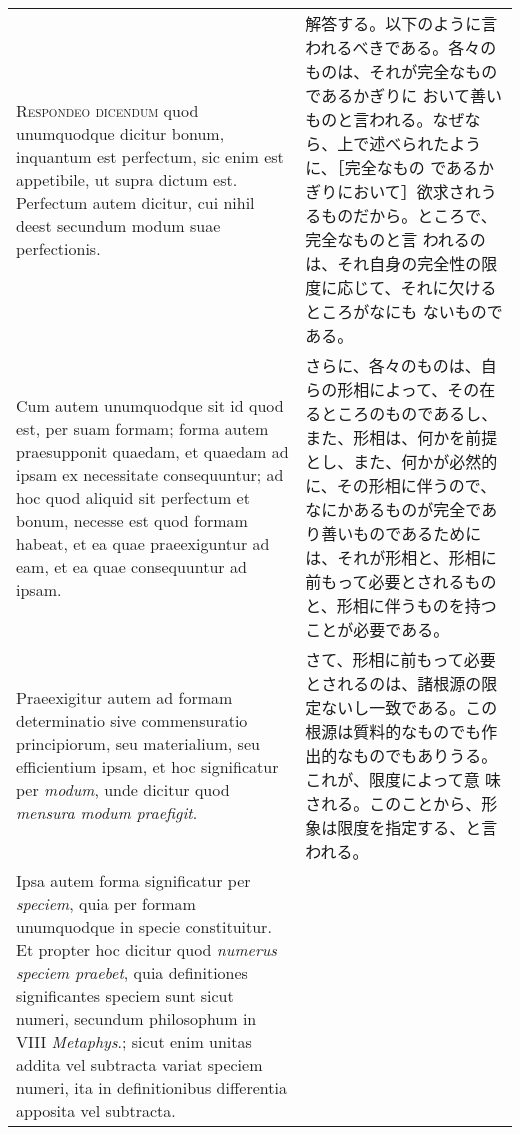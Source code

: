 \documentclass[10pt]{jsarticle} %
\begin{document}
\begin{longtable}{p{21em}p{21em}}
\\


{\scshape Respondeo dicendum} quod unumquodque dicitur bonum, inquantum est
 perfectum, sic enim est appetibile, ut supra dictum est. Perfectum
 autem dicitur, cui nihil deest secundum modum suae perfectionis. 

&

解答する。以下のように言われるべきである。各々のものは、それが完全なものであるかぎりに
 おいて善いものと言われる。なぜなら、上で述べられたように、［完全なもの
 であるかぎりにおいて］欲求されうるものだから。ところで、完全なものと言
 われるのは、それ自身の完全性の限度に応じて、それに欠けるところがなにも
 ないものである。

\\

Cum autem unumquodque sit id quod est, per suam formam; forma autem
 praesupponit quaedam, et quaedam ad ipsam ex necessitate consequuntur;
 ad hoc quod aliquid sit perfectum et bonum, necesse est quod formam
 habeat, et ea quae praeexiguntur ad eam, et ea quae consequuntur ad
 ipsam.

&


さらに、各々のものは、自らの形相によって、その在るところのものであるし、
 また、形相は、何かを前提とし、また、何かが必然的に、その形相に伴うので、
 なにかあるものが完全であり善いものであるためには、それが形相と、形相に
 前もって必要とされるものと、形相に伴うものを持つことが必要である。

\\

Praeexigitur autem ad formam determinatio sive commensuratio
 principiorum, seu materialium, seu efficientium ipsam, et hoc
 significatur per {\itshape modum}, unde dicitur quod {\itshape mensura modum praefigit}.

&


さて、形相に前もって必要とされるのは、諸根源の限定ないし一致である。この
 根源は質料的なものでも作出的なものでもありうる。これが、限度によって意
 味される。このことから、形象は限度を指定する、と言われる。

\\

Ipsa autem forma significatur per {\itshape speciem}, quia per formam unumquodque
 in specie constituitur. Et propter hoc dicitur quod {\itshape numerus speciem
 praebet}, quia definitiones significantes speciem sunt sicut numeri,
 secundum philosophum in VIII {\itshape Metaphys}.; sicut enim unitas addita vel
 subtracta variat speciem numeri, ita in definitionibus differentia
 apposita vel subtracta. 


\end{longtable}
\end{document}
